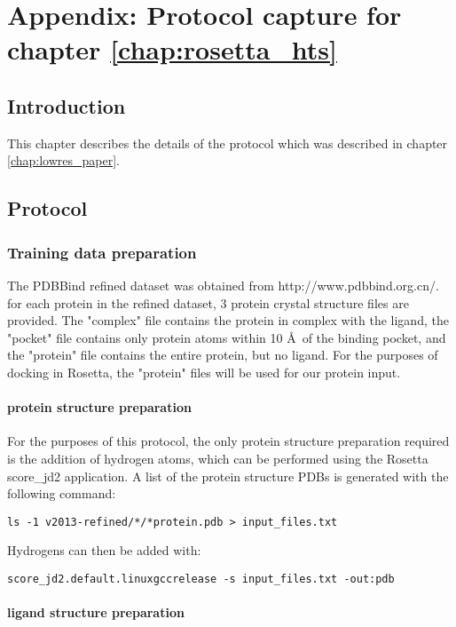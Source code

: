 \chapter{Appendix:  Protocol capture for chapter \ref{chap:rosetta_hts}}
\label{chap:hts_appendix}
\section{Introduction}

This chapter describes the details of the protocol which was described in chapter \ref{chap:lowres_paper}.

\section{Protocol}

\subsection{Training data preparation}
\label{subsec:training_data_prep}
The PDBBind refined dataset was obtained from http://www.pdbbind.org.cn/.
for each protein in the refined dataset, 3 protein crystal structure files are provided.
The "complex" file contains the protein in complex with the ligand, the "pocket" file contains only protein atoms within 10 \AA\ of the binding pocket, and the "protein" file contains the entire protein, but no ligand.
For the purposes of docking in Rosetta, the "protein" files will be used for our protein input.

\subsubsection{protein structure preparation}

For the purposes of this protocol, the only protein structure preparation required is the addition of hydrogen atoms, which can be performed using the Rosetta score\_jd2 application.
A list of the protein structure \ac{PDB}s is generated with the following command:
\singlespace
\begin{Verbatim}
ls -1 v2013-refined/*/*protein.pdb > input_files.txt
\end{Verbatim}
\doublespace
Hydrogens can then be added with:
\singlespace
\begin{Verbatim}
score_jd2.default.linuxgccrelease -s input_files.txt -out:pdb
\end{Verbatim}
\doublespace

\subsubsection{ligand structure preparation}

